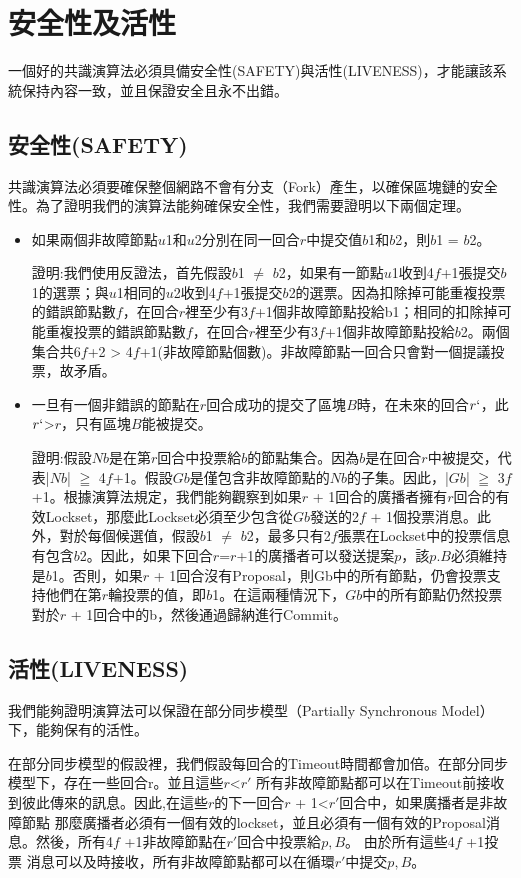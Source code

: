 \chapter{安全性及活性}\label{se_4}
一個好的共識演算法必須具備安全性(SAFETY)與活性(LIVENESS)，才能讓該系統保持內容一致，並且保證安全且永不出錯。
\section{安全性(SAFETY)}\label{se_4} 
共識演算法必須要確保整個網路不會有分支（Fork）產生，以確保區塊鏈的安全性。為了證明我們的演算法能夠確保安全性，我們需要證明以下兩個定理。
\begin{itemize}%
\item 如果兩個非故障節點$u$1和$u$2分別在同一回合$r$中提交值$b$1和$b$2，則$b$1 = $b$2。

證明:我們使用反證法，首先假設$b$1 $\ne$ $b$2，如果有一節點$u$1收到4$f$+1張提交$b$1的選票；與$u$1相同的$u$2收到4$f$+1張提交$b$2的選票。因為扣除掉可能重複投票的錯誤節點數$f$，在回合$r$裡至少有3$f$+1個非故障節點投給b1；相同的扣除掉可能重複投票的錯誤節點數$f$，在回合$r$裡至少有3$f$+1個非故障節點投給$b$2。兩個集合共6$f$+2 > 4$f$+1(非故障節點個數)。非故障節點一回合只會對一個提議投票，故矛盾。

\item 一旦有一個非錯誤的節點在$r$回合成功的提交了區塊$B$時，在未來的回合$r`$，此$r`$>$r$，只有區塊$B$能被提交。

證明:假設$Nb$是在第$r$回合中投票給$b$的節點集合。因為$b$是在回合$r$中被提交，代表|$Nb$| $\geqq$ 4$f$+1。假設$Gb$是僅包含非故障節點的$Nb$的子集。因此，|$Gb$| $\geqq$ 3$f$ +1。根據演算法規定，我們能夠觀察到如果$r$ + 1回合的廣播者擁有$r$回合的有效Lockset，那麼此Lockset必須至少包含從$Gb$發送的2$f$ + 1個投票消息。此外，對於每個候選值，假設$b$1 $\ne$ $b$2，最多只有2$f$張票在Lockset中的投票信息有包含$b$2。因此，如果下回合$r$=$r$+1的廣播者可以發送提案$p$，該$p.B$必須維持是$b$1。否則，如果$r$ + 1回合沒有Proposal，則Gb中的所有節點，仍會投票支持他們在第$r$輪投票的值，即$b$1。在這兩種情況下，$Gb$中的所有節點仍然投票對於$r$ + 1回合中的b，然後通過歸納進行Commit。
\end{itemize}

\section{活性(LIVENESS)}\label{se_4} 
我們能夠證明演算法可以保證在部分同步模型（Partially Synchronous Model）下，能夠保有的活性。

在部分同步模型的假設裡，我們假設每回合的Timeout時間都會加倍。在部分同步模型下，存在一些回合r。並且這些$r$<$r'$
所有非故障節點都可以在Timeout前接收到彼此傳來的訊息。因此,在這些$r$的下一回合$r$ + 1<$r'$回合中，如果廣播者是非故障節點
那麼廣播者必須有一個有效的lockset，並且必須有一個有效的Proposal消息。然後，所有4$f$ +1非故障節點在$r'$回合中投票給$p,B$。 由於所有這些4$f$ +1投票
消息可以及時接收，所有非故障節點都可以在循環$r'$中提交$p,B$。